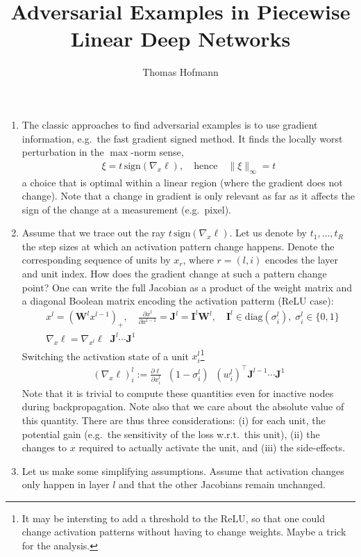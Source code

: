 \documentclass{article}
\author{Thomas Hofmann}
\title{Adversarial Examples in Piecewise Linear Deep Networks}
\newcommand{\mI}{{\mathbf I}}
\newcommand{\mJ}{{\mathbf J}}
\newcommand{\mW}{{\mathbf W}}
\begin{document}
\maketitle 
\begin{enumerate}
\item The classic approaches to find adversarial examples is to use gradient information, e.g.~the fast gradient signed method. It finds the locally worst perturbation in the $\max$-norm sense,
\begin{align}
\xi = t \, \text{sign} (\nabla_x \ell), \quad \text{hence} \quad \|\xi\|_\infty = t
\end{align} 
a choice that is optimal within a linear region (where the gradient does not change). Note that a change in gradient is only relevant as far as it affects the sign of the change at a measurement (e.g.~pixel). 

\item Assume that we trace out the ray $t \, \text{sign} (\nabla_x \ell)$. Let us denote by $t_1, \dots, t_R$ the step sizes at which an activation pattern change happens. Denote the corresponding sequence of units by $x_r$, where $r=(l,i)$ encodes the layer and unit index. How does the gradient change at such a pattern change point? One can write the full Jacobian as a product of the weight matrix and a diagonal Boolean matrix encoding the activation patterm (ReLU case): 
\begin{align}
& x^{l} = \left( \mW^l x^{l-1} \right)_+, \quad  \frac{\partial x^{l}}{\partial x^{l-1}} = \mJ^l = \mI^l \mW^l, \quad \mI^l \in \text{diag}(\sigma^l_i), \; \sigma^l_i \in \{0,1\} \\
& \nabla_x \ell = \nabla_{x^{l}}\ell \;\;  \mJ^l \cdots \mJ^1 
\end{align}
Switching the activation state of a unit $x_i^l$\footnote{It may be intersting to add a threshold to the ReLU, so that one could change activation patterns without having to change weights. Maybe a trick for the analysis.}
\begin{align}
(\nabla_x \ell)^l_i:=  \frac{\partial \ell}{\partial  x^l_i} \; \; (1-\sigma^l_i) \;\;  (w_i^l)^\top \mJ^{l-1} \cdots \mJ^1
\end{align}
Note that it is trivial to compute these quantities even for inactive nodes during backpropagation. Note also that we care about the absolute value of this quantity. There are thus three considerations: (i) for each unit, the potential gain (e.g.~the sensitivity of the loss w.r.t.~this unit), (ii) the changes to $x$ required to actually activate the unit, and (iii) the side-effects. 
\item Let us make some simplifying assumptions. Assume that activation changes only happen in layer $l$ and that the other Jacobians remain unchanged.
\end{enumerate}



\end{document}
